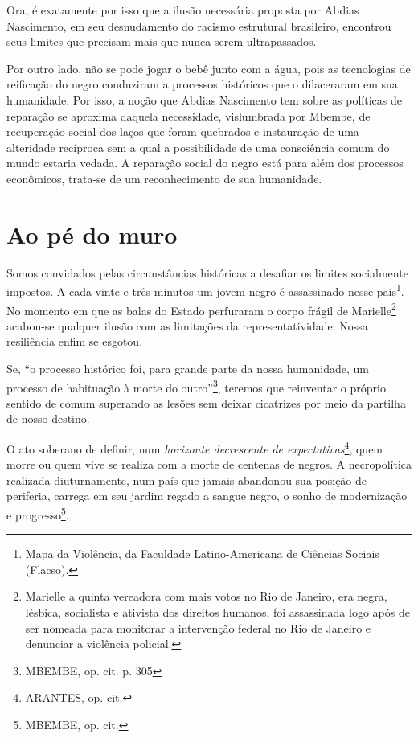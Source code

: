 Ora, é exatamente por isso que a ilusão necessária proposta por Abdias
Nascimento, em seu desnudamento do racismo estrutural brasileiro,
encontrou seus limites que precisam mais que nunca serem ultrapassados.

Por outro lado, não se pode jogar o bebê junto com a água, pois as
tecnologias de reificação do negro conduziram a processos históricos que
o dilaceraram em sua humanidade. Por isso, a noção que Abdias Nascimento
tem sobre as políticas de reparação se aproxima daquela necessidade,
vislumbrada por Mbembe, de recuperação social dos laços que foram
quebrados e instauração de uma alteridade recíproca sem a qual a
possibilidade de uma consciência comum do mundo estaria vedada. A
reparação social do negro está para além dos processos econômicos,
trata-se de um reconhecimento de sua humanidade.

\chapter{Ao pé do muro}

Somos convidados pelas circunstâncias históricas a desafiar os limites
socialmente impostos. A cada vinte e três minutos um jovem negro é
assassinado nesse país\footnote{Mapa da Violência, da Faculdade
  Latino-Americana de Ciências Sociais (Flacso).}. No momento em que as
balas do Estado perfuraram o corpo frágil de Marielle\footnote{Marielle
  a quinta vereadora com mais votos no Rio de Janeiro, era negra,
  lésbica, socialista e ativista dos direitos humanos, foi assassinada
  logo após de ser nomeada para monitorar a intervenção federal no Rio
  de Janeiro e denunciar a violência policial.} acabou-se qualquer
ilusão com as limitações da representatividade. Nossa resiliência enfim
se esgotou.

Se, ``o processo histórico foi, para grande parte da nossa humanidade,
um processo de habituação à morte do outro''\footnote{MBEMBE, op. cit.
  p. 305}, teremos que reinventar o próprio sentido de comum superando
as lesões sem deixar cicatrizes por meio da partilha de nosso destino.

O ato soberano de definir, num \emph{horizonte decrescente de
expectativas}\footnote{ARANTES, op. cit.}, quem morre ou quem vive se
realiza com a morte de centenas de negros. A necropolítica realizada
diuturnamente, num país que jamais abandonou sua posição de periferia,
carrega em seu jardim regado a sangue negro, o sonho de modernização e
progresso\footnote{MBEMBE, op. cit.}.

